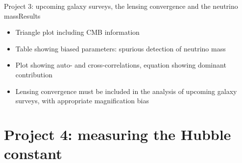 \documentclass{beamer}
\begin{document}
\begin{frame}{Project 3: upcoming galaxy surveys, the lensing convergence and the neutrino mass}{Results}
\begin{itemize}
\item Triangle plot including CMB information
\item Table showing biased parameters: spurious detection of neutrino mass
\item Plot showing auto- and cross-correlations, equation showing dominant contribution
\item Lensing convergence must be included in the analysis of upcoming galaxy surveys, with appropriate magnification bias
\end{itemize}
\end{frame}

\section{Project 4: measuring the Hubble constant}
\end{document}
